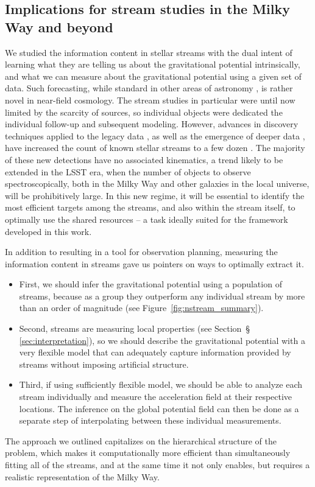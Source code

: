 \documentclass[modern]{aastex61}
\begin{document}
\subsection{Implications for stream studies in the Milky Way and beyond}
\label{sec:dis_applications}
We studied the information content in stellar streams with the dual intent of learning what they are telling us about the gravitational potential intrinsically, and what we can measure about the gravitational potential using a given set of data.
Such forecasting, while standard in other areas of astronomy \citep[e.g.,][]{bond1997,tegmark2000}, is rather novel in near-field cosmology.
The stream studies in particular were until now limited by the scarcity of sources, so individual objects were dedicated the individual follow-up and subsequent modeling.
However, advances in discovery techniques applied to the legacy data \citep{grillmair2014,grillmair2017a}, as well as the emergence of deeper data \citep{shipp2018}, have increased the count of known stellar streams to a few dozen \citep{grillmair2016}.
The majority of these new detections have no associated kinematics, a trend likely to be extended in the LSST era, when the number of objects to observe spectroscopically, both in the Milky Way and other galaxies in the local universe, will be prohibitively large.
In this new regime, it will be essential to identify the most efficient targets among the streams, and also within the stream itself, to optimally use the shared resources -- a task ideally suited for the framework developed in this work.

In addition to resulting in a tool for observation planning, measuring the information content in streams gave us pointers on ways to optimally extract it.
\begin{itemize}
\item{First, we should infer the gravitational potential using a population of streams, because as a group they outperform any individual stream by more than an order of magnitude (see Figure~\ref{fig:nstream_summary}).}
\item{Second, streams are measuring local properties (see Section~\S\,\ref{sec:interpretation}), so we should describe the gravitational potential with a very flexible model that can adequately capture information provided by streams without imposing artificial structure.}
\item{Third, if using sufficiently flexible model, we should be able to analyze each stream individually and measure the acceleration field at their respective locations.
The inference on the global potential field can then be done as a separate step of interpolating between these individual measurements.}
\end{itemize}
The approach we outlined capitalizes on the hierarchical structure of the problem, which makes it computationally more efficient than simultaneously fitting all of the streams, and at the same time it not only enables, but requires a realistic representation of the Milky Way.
\end{document}
